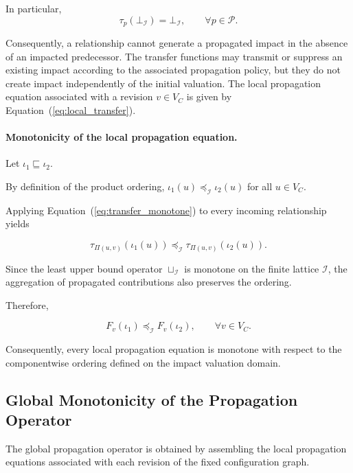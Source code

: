 \documentclass[10pt]{article}
\begin{document}
In particular,
\begin{equation}
	\tau_p
	\left(
	\bot_{\mathcal I}
	\right)
	=
	\bot_{\mathcal I},
	\qquad
	\forall p\in\mathcal P.
	\label{eq:transfer_bottom_preservation}
\end{equation}

Consequently, a relationship cannot generate a propagated impact in the absence of an impacted predecessor. The transfer functions may transmit or suppress an existing impact according to the associated propagation policy, but they do not create impact independently of the initial valuation.
The local propagation equation associated with a revision $v\in V_C$ is
given by Equation~(\ref{eq:local_transfer}).

\paragraph{Monotonicity of the local propagation equation.}

Let $\iota_1\sqsubseteq\iota_2$.

By definition of the product ordering,
$\iota_1(u)\preceq_{\mathcal I}\iota_2(u)$ for all $u\in V_C$.

Applying Equation~(\ref{eq:transfer_monotone}) to every incoming relationship
yields

\begin{equation}
\label{eq:tau_pi_def1}
\tau_{\Pi(u,v)}
(
\iota_1(u)
)
\preceq_{\mathcal I}
\tau_{\Pi(u,v)}
(
\iota_2(u)
).
\end{equation}

Since the least upper bound operator $\sqcup_{\mathcal I}$
is monotone on the finite lattice $\mathcal I$, the aggregation of propagated contributions also preserves the ordering.

Therefore,

\begin{equation}
	\label{eq:local_monotone}
	F_v(\iota_1)
	\preceq_{\mathcal I}
	F_v(\iota_2),
	\qquad
	\forall v\in V_C.
\end{equation}

Consequently, every local propagation equation is monotone with respect to the componentwise ordering defined on the impact valuation domain.

\subsection{Global Monotonicity of the Propagation Operator}
\label{appendix:global_monotonicity}
The global propagation operator is obtained by assembling the local propagation equations associated with each revision of the fixed configuration graph.
\end{document}
